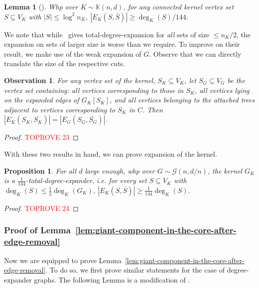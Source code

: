 \documentclass[11pt]{article}
\theoremstyle{plain}
\newtheorem{lemma}[theorem]{Lemma}
\newtheorem{proposition}[theorem]{Proposition}
\newtheorem{observation}[theorem]{Observation}
\newcommand{\G}{\mathcal{G}}
\newcommand{\1}{\mathbb{1}}
\newcommand{\Kb}{\mathbb{K}}
\begin{document}
\begin{lemma}[{\cite[Lemma 15]{GALANIS2022104894}}]\label{lem:small-set-expansion}
    Whp over \(K\sim\Kb(n,d)\), for any connected \emph{kernel} vertex set \(S\subseteq V_K\) with \(|S|\leq\log^2 n_K\), \(|E_K(S,\overline S)|\geq \deg_K(S) / 144\).
\end{lemma}

We note that while~\cite{GALANIS2022104894} gives total-degree-expansion for \textit{all} sets of size \(\leq n_K/2\), the expansion on sets of larger size is worse than we require. To improve on their result, we make use of the weak expansion of \(G\). Observe that we can directly translate the size of the respective cuts.

\begin{observation}\label{obs:cuts-are-preserved}
    For any vertex set of the kernel, \(S_K\subseteq V_K\), let \(S_G\subseteq V_G\) be the vertex set containing: all vertices corresponding to those in \(S_K\), all vertices lying on the expanded edges of \(G_K[S_K]\), and all vertices belonging to the attached trees adjacent to vertices corresponding to \(S_K\) in \(C\). Then \(|E_K(S_K,\overline{S_K})| = |E_G(S_G,\overline{S_G})|\).
\end{observation}
\begin{proof}\textcolor{red}{TOPROVE 23}\end{proof}

With these two results in hand, we can prove expansion of the kernel.

\begin{proposition}\label{prop:expansion-of-kernel}
    For all \(d\) large enough, whp over \(G\sim\G(n,d/n)\), the kernel \(G_K\) is a \emph{\(\tfrac{1}{144}\)-total-degree-expander}, i.e. for \emph{every} set \(S\subseteq V_K\) with \(\deg_K(S) \leq \tfrac 12 \deg_K(G_K)\), \(|E_K(S,\overline S)|\geq \tfrac{1}{144} \deg_K(S)\). 
\end{proposition}
\begin{proof}\textcolor{red}{TOPROVE 24}\end{proof}

\subsubsection{Proof of Lemma~\ref{lem:giant-component-in-the-core-after-edge-removal}}

Now we are equipped to prove Lemma~\ref{lem:giant-component-in-the-core-after-edge-removal}. To do so, we first prove similar statements for the case of degree-expander graphs. The following Lemma is a modification of \cite[Lemma 2.3]{trevisan2016expanders}.
\end{document}
